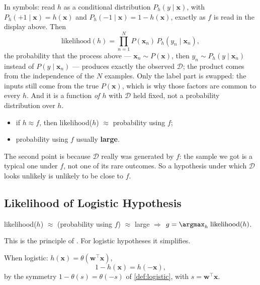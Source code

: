 \begin{note}
    In symbols: read \(h\) as a conditional distribution \(P_h(y \mid \bm{x})\),
    with \(P_h(+1 \mid \bm{x}) = h(\bm{x})\) and \(P_h(-1 \mid \bm{x}) = 1 -
    h(\bm{x})\), exactly as \(f\) is read in the display above. Then
    \[
        \text{likelihood}(h) = \prod_{n=1}^N P(\bm{x}_n) \, P_h(y_n \mid
        \bm{x}_n) ,
    \]
    the probability that the process above --- \(\bm{x}_n \sim P(\bm{x})\),
    then \(y_n \sim P_h(y \mid \bm{x}_n)\) instead of \(P(y \mid \bm{x}_n)\)
    --- produces exactly the observed \(\mathcal{D}\); the product comes from
    the independence of the \(N\) examples. Only the label part is swapped: the
    inputs still come from the true \(P(\bm{x})\), which is why those factors
    are common to every \(h\). And it is a function \emph{of \(h\)} with
    \(\mathcal{D}\) held fixed, not a probability distribution over \(h\).
\end{note}

\begin{itemize}
    \item if \(h \approx f\), then likelihood(\(h\)) \(\approx\) probability
        using \(f\);
    \item probability using \(f\) usually \textbf{large}.
\end{itemize}

The second point is because \(\mathcal{D}\) really was generated by \(f\): the
sample we got is a typical one under \(f\), not one of its rare outcomes. So a
hypothesis under which \(\mathcal{D}\) looks unlikely is unlikely to be close
to \(f\).

\subsection{Likelihood of Logistic Hypothesis}

\begin{moral}
    likelihood(\(h\)) \(\approx\) (probability using \(f\)) \(\approx\) large
    \quad \(\Longrightarrow\) \quad
    \(\displaystyle g = \argmax_h \; \text{likelihood}(h)\).
\end{moral}

This is the principle of . For logistic hypotheses
it simplifies.

\begin{center}
    \begin{minipage}[c]{0.55\textwidth}
        When logistic: \(h(\bm{x}) = \theta(\bm{w}^\top \bm{x})\),
        \[
            1 - h(\bm{x}) = h(-\bm{x}) ,
        \]
        by the symmetry \(1 - \theta(s) = \theta(-s)\) of
        \autoref{def:logistic}, with \(s = \bm{w}^\top \bm{x}\).
    \end{minipage}%
    \begin{minipage}[c]{0.4\textwidth}
        \centering
        \thetacurve
    \end{minipage}
\end{center}

